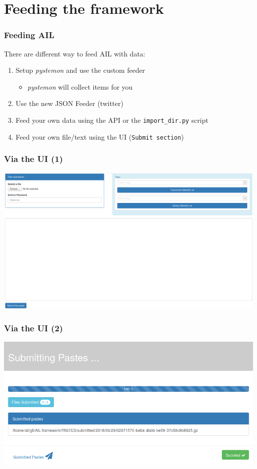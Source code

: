 \documentclass{beamer}
\begin{document}
\section{Feeding the framework}
\begin{frame}
\frametitle{Feeding AIL}
    There are different way to feed AIL with data:
    \begin{enumerate}
        \item Setup \textit{pystemon} and use the custom feeder
            \begin{itemize}
                \item \textit{pystemon} will collect items for you
            \end{itemize}
        \item Use the new JSON Feeder (twitter)
        \item Feed your own data using the API or the \texttt{import\_dir.py} script
        \item Feed your own file/text using the UI (\texttt{Submit section})
    \end{enumerate}
\end{frame}

\begin{frame}
    \frametitle{Via the UI (1)}
    \centerline{\includegraphics[scale=0.20]{screenshot/paste_submit.png}}
\end{frame}

\begin{frame}
    \frametitle{Via the UI (2)}
    \centerline{\includegraphics[scale=0.25]{screenshot/paste_submitted.png}}
\end{frame}
\end{document}
